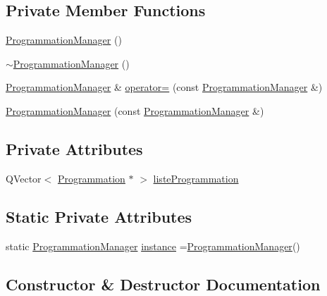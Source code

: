 \subsection*{Private Member Functions}
\begin{DoxyCompactItemize}
\item 
\hyperlink{class_programmation_manager_ac493a099c33e7ea0cf8eb4b6036f0a1a}{Programmation\+Manager} ()
\item 
\hyperlink{class_programmation_manager_a51a54dc0fee78a0b831519f3cde27ff6}{$\sim$\+Programmation\+Manager} ()
\item 
\hyperlink{class_programmation_manager}{Programmation\+Manager} \& \hyperlink{class_programmation_manager_a64a3749fe471a9cb58c598d4308ab994}{operator=} (const \hyperlink{class_programmation_manager}{Programmation\+Manager} \&)
\item 
\hyperlink{class_programmation_manager_a05cc9a749fdd300053ea89e947d03571}{Programmation\+Manager} (const \hyperlink{class_programmation_manager}{Programmation\+Manager} \&)
\end{DoxyCompactItemize}
\subsection*{Private Attributes}
\begin{DoxyCompactItemize}
\item 
Q\+Vector$<$ \hyperlink{class_programmation}{Programmation} $\ast$ $>$ \hyperlink{class_programmation_manager_a23540a1467db12d716d19641d70447b8}{liste\+Programmation}
\end{DoxyCompactItemize}
\subsection*{Static Private Attributes}
\begin{DoxyCompactItemize}
\item 
static \hyperlink{class_programmation_manager}{Programmation\+Manager} \hyperlink{class_programmation_manager_a04ca8715bceaec304a821a6d61b5a94d}{instance} =\hyperlink{class_programmation_manager}{Programmation\+Manager}()
\end{DoxyCompactItemize}


\subsection{Constructor \& Destructor Documentation}
\hypertarget{class_programmation_manager_ac493a099c33e7ea0cf8eb4b6036f0a1a}{}
